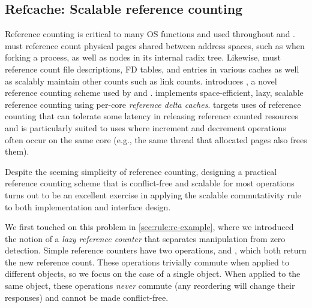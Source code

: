 \subsection{Refcache: Scalable reference counting}
\label{sec:sv6:refcache}

Reference counting is critical to many OS functions and used
throughout \vm and \fs.  \vm must reference count physical pages
shared between address spaces, such as when forking a process, as well
as nodes in its internal radix tree.  Likewise, \fs must reference
count file descriptions, FD tables, and entries in various caches as
well as scalably maintain other counts such as link counts.
%
 introduces , a novel reference
counting scheme
used by \vm and \fs.   implements space-efficient, lazy,
scalable reference counting using per-core \emph{reference delta
  caches}.   targets uses of reference counting that can
tolerate some latency in releasing reference counted resources and is
particularly suited to uses where increment and decrement operations
often occur on the same core (e.g., the same thread that allocated
pages also frees them).


Despite the seeming simplicity of reference counting, designing a
practical reference counting scheme that is conflict-free and scalable
for most operations turns out to be an excellent exercise in applying
the scalable commutativity rule to both implementation and interface
design.

We first touched on this problem in \cref{sec:rule:rc-example}, where
we introduced the notion of a \emph{lazy reference counter} that
separates manipulation from zero detection.  Simple reference counters
have two operations,
 and , which both return the new
reference count.  These operations trivially commute when applied to
different objects, so we focus on the case of a single object.  When
applied to the same object, these operations \emph{never} commute (any
reordering will change their responses) and cannot be made
conflict-free.

